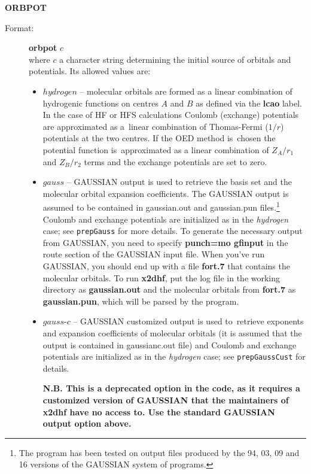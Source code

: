 \documentclass[12pt,a4paper]{article}
\newcommand{\ft}[1]{\texttt{#1}}
\begin{document}
\begin{description}
\item \textbf{ORBPOT}
\begin{description}
\item[Format:] \textbf{orbpot} $c$\\
  where $c$ a character string determining the initial source of
  orbitals and potentials. Its allowed values are:
\begin{itemize}
\item $hydrogen$ -- molecular orbitals are formed as a linear combination of hydrogenic
  functions on centres $A$ and $B$ as defined via the \textbf{lcao} label. In the case of
  HF or HFS calculations Coulomb (exchange) potentials are approximated as a~linear
  combination of Thomas-Fermi ($1/r$) potentials at the two centres. If the OED method
  is~chosen the potential function is~approximated as a linear combination of $Z_A/r_1$
  and $Z_B/r_2$ terms and the exchange potentials are set to zero.

\item $gauss$ -- GAUSSIAN output is used to retrieve the basis set and
  the molecular orbital expansion coefficients. The GAUSSIAN output is
  assumed to be contained in gaussian.out and gaussian.pun
  files.\footnote{The program has been tested on output files produced
    by the 94, 03, 09 and 16 versions of the GAUSSIAN system of
    programs.} Coulomb and exchange potentials are initialized as in
  the \textsl{hydrogen} case; see \ft{prepGauss} for more details.
  To generate the necessary output from GAUSSIAN, you need to specify
  {\bf punch=mo gfinput} in the route section of the GAUSSIAN input
  file. When you've run GAUSSIAN, you should end up with a file {\bf
    fort.7} that contains the molecular orbitals. To run {\bf x2dhf},
  put the log file in the working directory as {\bf gaussian.out} and
  the molecular orbitals from {\bf fort.7} as {\bf gaussian.pun},
  which will be parsed by the program.

\item $gauss$-$c$ -- GAUSSIAN customized output is used to~retrieve
  exponents and expansion coefficients of molecular orbitals (it is
  assumed that the output is contained in gaussianc.out file) and
  Coulomb and exchange potentials are initialized as in the
  \textsl{hydrogen} case; see \ft{prepGaussCust} for details.

  {\bf N.B. This is a deprecated option in the code, as it requires a
    customized version of GAUSSIAN that the maintainers of x2dhf have
    no access to. Use the standard GAUSSIAN output option above.}


\end{itemize}
\end{description}
\end{description}
\end{document}

